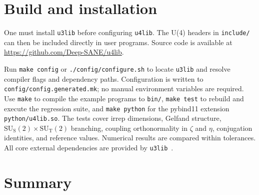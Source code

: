 \documentclass[aps,onecolumn,10pt,superscriptaddress,floatfix,nofootinbib]{revtex4}
\begin{document}

\section{Build and installation}
\label{sec:build}

One must install \texttt{u3lib} before configuring \texttt{u4lib}. The U(4) headers in
\verb|include/| can then be included directly in user programs. Source code is
available at \url{https://github.com/Deep-SANE/u4lib}.

Run \verb|make config| or \verb|./config/configure.sh| to locate
\texttt{u3lib} and resolve compiler flags and dependency paths. Configuration
is written to \verb|config/config.generated.mk|; no manual environment
variables are required. Use \verb|make| to compile the example programs to
\verb|bin/|, \verb|make test| to rebuild and execute the regression suite,
and \verb|make python| for the pybind11 extension \verb|python/u4lib.so|.
The tests cover irrep dimensions, Gelfand structure,
$\mathrm{SU_S(2)}\times\mathrm{SU_T(2)}$ branching, coupling orthonormality in
$\zeta$ and $\eta$, conjugation identities, and reference values.
Numerical results are compared within tolerances.
All core external dependencies are provided by \texttt{u3lib}~\cite{Langr2026u3lib}.

\section{Summary}
\label{sec:summary}
\end{document}

